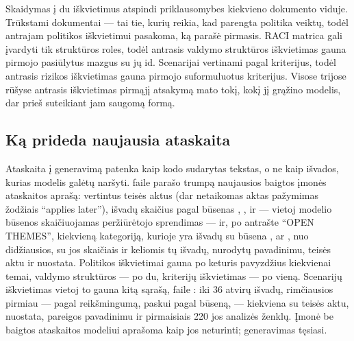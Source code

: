 Skaidymas į du iškvietimus atspindi priklausomybes kiekvieno dokumento viduje. Trūkstami
dokumentai --- tai tie, kurių reikia, kad parengta politika veiktų, todėl antrajam politikos
iškvietimui pasakoma, ką parašė pirmasis. RACI matrica gali įvardyti tik struktūros roles,
todėl antrasis valdymo struktūros iškvietimas gauna pirmojo pasiūlytus mazgus su jų id.
Scenarijai vertinami pagal kriterijus, todėl antrasis rizikos iškvietimas gauna pirmojo
suformuluotus kriterijus. Visose trijose rūšyse antrasis iškvietimas pirmąjį atsakymą mato
tokį, kokį jį grąžino modelis, dar prieš  suteikiant jam saugomą formą.

\subsection{Ką prideda naujausia ataskaita}\label{sec:programme:report}

Ataskaita į generavimą patenka kaip kodo sudarytas tekstas, o ne kaip išvados, kurias modelis
galėtų naršyti.  faile  parašo trumpą naujausios
baigtos įmonės ataskaitos aprašą: vertintus teisės aktus (dar netaikomas aktas pažymimas
žodžiais \enquote{applies later}), išvadų skaičius pagal būsenas , ,
 ir  --- vietoj modelio būsenos skaičiuojamas peržiūrėtojo
sprendimas --- ir, po antrašte \enquote{OPEN THEMES}, kiekvieną kategoriją, kurioje yra išvadų
su būsena ,  ar , nuo didžiausios, su jos
skaičiais ir keliomis tų išvadų, nurodytų pavadinimu, teisės aktu ir nuostata. Politikos
iškvietimai gauna po keturis pavyzdžius kiekvienai temai, valdymo struktūros --- po du,
kriterijų iškvietimas --- po vieną. Scenarijų iškvietimas vietoj to gauna kitą sąrašą,
 faile : iki 36 atvirų išvadų, rimčiausios
pirmiau --- pagal reikšmingumą, paskui pagal būseną, --- kiekviena su teisės aktu, nuostata,
pareigos pavadinimu ir pirmaisiais 220 jos analizės ženklų. Įmonė be baigtos ataskaitos
modeliui aprašoma kaip jos neturinti; generavimas tęsiasi.


